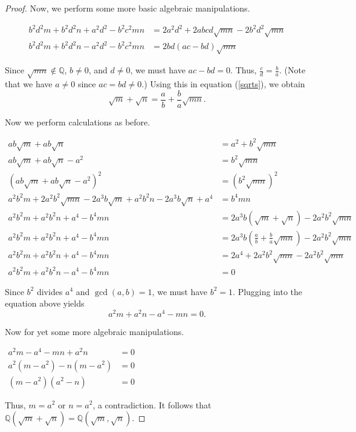 \documentclass[12pt]{article}
\newcommand{\Q}{\mathbb{Q}}
\begin{document}
\begin{proof}
Now, we perform some more basic algebraic manipulations.

\begin{align*}
b^2d^2m+b^2d^2n+a^2d^2-b^2c^2mn & =2a^2d^2+2abcd\sqrt{mn}-2b^2d^2\sqrt{mn} \\
b^2d^2m+b^2d^2n-a^2d^2-b^2c^2mn & =2bd(ac-bd)\sqrt{mn}
\end{align*}

Since $\sqrt{mn}\notin\Q$, $b\neq 0$, and $d\neq 0$, we must have $ac-bd=0$.  Thus, $\frac{c}{d}=\frac{b}{a}$.  (Note that we have $a\neq 0$ since $ac=bd\neq 0$.)  Using this in equation (\ref{sqrts}), we obtain
\[
\sqrt{m}+\sqrt{n}=\frac{a}{b}+\frac{b}{a}\sqrt{mn}.
\]

Now we perform  calculations as before.

\begin{align*}
ab\sqrt{m}+ab\sqrt{n} & =a^2+b^2\sqrt{mn} \\
ab\sqrt{m}+ab\sqrt{n}-a^2 & =b^2\sqrt{mn} \\
(ab\sqrt{m}+ab\sqrt{n}-a^2)^2 & =(b^2\sqrt{mn})^2 \\
a^2b^2m+2a^2b^2\sqrt{mn}-2a^3b\sqrt{m}+a^2b^2n-2a^3b\sqrt{n}+a^4 & =b^4mn \\
a^2b^2m+a^2b^2n+a^4-b^4mn & =2a^3b(\sqrt{m}+\sqrt{n})-2a^2b^2\sqrt{mn} \\
a^2b^2m+a^2b^2n+a^4-b^4mn & =2a^3b\left( \frac{a}{b}+\frac{b}{a}\sqrt{mn} \right)-2a^2b^2\sqrt{mn} \\
a^2b^2m+a^2b^2n+a^4-b^4mn & =2a^4+2a^2b^2\sqrt{mn}-2a^2b^2\sqrt{mn} \\
a^2b^2m+a^2b^2n-a^4-b^4mn & =0
\end{align*}

Since $b^2$ divides $a^4$ and $\gcd(a,b)=1$, we must have $b^2=1$.  Plugging into the equation above yields
\[
a^2m+a^2n-a^4-mn=0.
\]

Now for yet some more algebraic manipulations.
\begin{center}
$\begin{array}{rl}
a^2m-a^4-mn+a^2n & =0 \\
a^2(m-a^2)-n(m-a^2) & =0 \\
(m-a^2)(a^2-n) & =0
\end{array}$
\end{center}

Thus, $m=a^2$ or $n=a^2$, a contradiction.  It follows that $\Q(\sqrt{m}+\sqrt{n})=\Q(\sqrt{m},\sqrt{n})$.
\end{proof}
\end{document}
